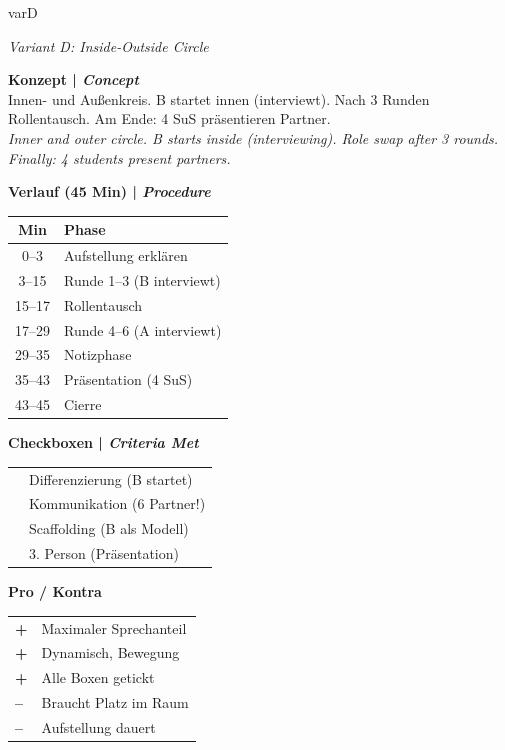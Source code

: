 \documentclass[11pt, a4paper]{article}
\newcommand{\en}[1]{{\small\color{english}\textit{#1}}}
\newcommand{\cmark}{\textcolor{success}{\ding{51}}}
\newcommand{\pro}{\textcolor{success}{\textbf{+}}}
\newcommand{\kontra}{\textcolor{spanisch}{\textbf{--}}}
\newcommand{\risikoniedrig}{\colorbox{success!20}{\textcolor{success}{\scriptsize\textbf{NIEDRIG}}}}
\newcommand{\score}[1]{\colorbox{spanisch!15}{\textcolor{spanisch}{\textbf{#1/10}}}}
\begin{document}
\begin{varbox}[title={\textcolor{varD}{VARIANTE D: Kugellager (Doppelkreis)} \hfill \score{9.3} \risikoniedrig}]{varD}

\en{Variant D: Inside-Outside Circle}

\vspace{0.2cm}

\begin{minipage}[t]{0.48\textwidth}
\textbf{Konzept | \en{Concept}}\\[0.1cm]
Innen- und Außenkreis. B startet innen (interviewt). Nach 3 Runden Rollentausch. Am Ende: 4 SuS präsentieren Partner.\\[0.1cm]
\en{Inner and outer circle. B starts inside (interviewing). Role swap after 3 rounds. Finally: 4 students present partners.}

\vspace{0.3cm}

\textbf{Verlauf (45 Min) | \en{Procedure}}\\[0.1cm]
\small
\begin{tabular}{|c|l|}
\hline
\rowcolor{varD!10}
\textbf{Min} & \textbf{Phase} \\
\hline
0--3 & Aufstellung erklären \\
3--15 & Runde 1--3 (B interviewt) \\
15--17 & Rollentausch \\
17--29 & Runde 4--6 (A interviewt) \\
29--35 & Notizphase \\
35--43 & Präsentation (4 SuS) \\
43--45 & Cierre \\
\hline
\end{tabular}
\end{minipage}
\hfill
\begin{minipage}[t]{0.48\textwidth}
\textbf{Checkboxen | \en{Criteria Met}}\\[0.1cm]
\begin{tabular}{ll}
\cmark & Differenzierung (B startet) \\
\cmark & Kommunikation (6 Partner!) \\
\cmark & Scaffolding (B als Modell) \\
\cmark & 3. Person (Präsentation) \\
\end{tabular}

\vspace{0.3cm}

\textbf{Pro / Kontra}\\[0.1cm]
\begin{tabular}{ll}
\pro & Maximaler Sprechanteil \\
\pro & Dynamisch, Bewegung \\
\pro & Alle Boxen getickt \\
\kontra & Braucht Platz im Raum \\
\kontra & Aufstellung dauert \\
\end{tabular}


\end{minipage}
\end{varbox}
\end{document}
